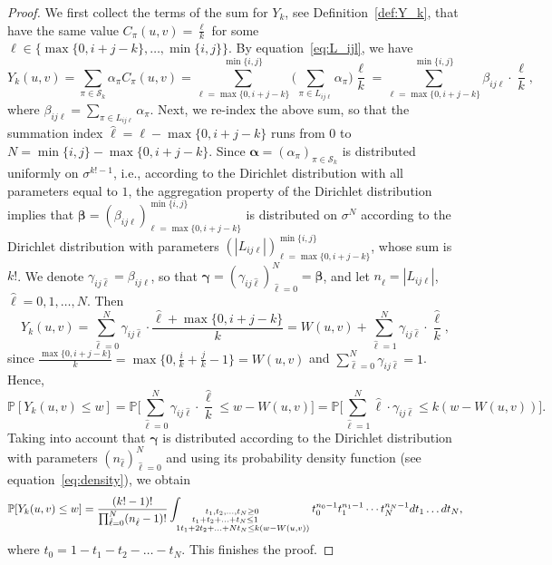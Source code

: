 \documentclass[12pt,a4paper]{amsart}
\theoremstyle{definition}
\newcommand{\SK}{\mathcal{S}_k}
\newcommand{\PP}{\mathbb{P}}
\newcommand{\aaa}{\boldsymbol{\alpha}}
\newcommand{\bbb}{\boldsymbol{\beta}}
\newcommand{\ccc}{\boldsymbol{\gamma}}
\newcommand{\hell}{\hat{\ell}}
\begin{document}
\begin{proof}
We first collect the terms of the sum for $Y_k$, see Definition~\ref{def:Y_k}, that have the same value $C_{\pi}(u,v)=\frac{\ell}{k}$ for some $\ell \in \bigl\{\max\{0,i+j-k\},\ldots,\min\{i,j\}\bigr\}$.
By equation~\eqref{eq:L_ijl}, we have
\begin{equation*}
    Y_k(u,v) =\sum_{\pi \in \SK} \alpha_\pi C_{\pi}(u,v) =\sum_{\ell=\max\{0,i+j-k\}}^{\min\{i,j\}} \Big(\sum_{\pi \in L_{ij\ell}}\alpha_\pi\Big) \frac{\ell}{k}=\sum_{\ell=\max\{0,i+j-k\}}^{\min\{i,j\}} \beta_{ij\ell} \cdot \frac{\ell}{k},
\end{equation*}
where $\beta_{ij\ell}=\sum_{\pi \in L_{ij\ell}}\alpha_\pi$. Next, we re-index the above sum, so that the summation index $\hell=\ell-\max\{0,i+j-k\}$ runs from $0$ to $N=\min\{i,j\}-\max\{0,i+j-k\}$. Since $\aaa=(\alpha_\pi)_{\pi \in \SK}$ is distributed uniformly on $\sigma^{k!-1}$, i.e., according to the Dirichlet distribution with all parameters equal to $1$, the aggregation property of the Dirichlet distribution implies that $\bbb=(\beta_{ij\ell})_{\ell=\max\{0,i+j-k\}}^{\min\{i,j\}}$ is distributed on $\sigma^N$ according to the Dirichlet distribution with parameters $(|L_{ij\ell}|)_{\ell=\max\{0,i+j-k\}}^{\min\{i,j\}}$, whose sum is $k!$.
We denote $\gamma_{ij\hell}=\beta_{ij\ell}$, so that $\ccc=(\gamma_{ij\hell})_{\hell=0}^N=\bbb$, and let $n_{\hell}=|L_{ij\ell}|$, $\hell=0,1,\ldots,N$.
Then
\begin{equation*}
    Y_k(u,v) =\sum_{\hell=0}^N \gamma_{ij\hell} \cdot \frac{\hell+\max\{0,i+j-k\}}{k}=W(u,v)+\sum_{\hell=1}^N \gamma_{ij\hell} \cdot \frac{\hell}{k},
\end{equation*}
since $\frac{\max\{0,i+j-k\}}{k}=\max\{0,\frac{i}{k}+\frac{j}{k}-1\}=W(u,v)$ and $\sum_{\hell=0}^N \gamma_{ij\hell}=1$.
Hence,
\begin{equation*}
    \PP[Y_k(u,v) \le w] =\PP\big[\sum_{\hell=0}^N \gamma_{ij\hell} \cdot \frac{\hell}{k} \le w-W(u,v)\big]=\PP\big[\sum_{\hell=1}^N \hell \cdot \gamma_{ij\hell} \le k(w-W(u,v))\big].
\end{equation*}
Taking into account that $\ccc$ is distributed according to the Dirichlet distribution with parameters $(n_{\hell})_{\hell=0}^N$ and using its probability density function (see equation~\eqref{eq:density}), we obtain
\begin{equation*}
    \PP[Y_k(u,v) \le w] =\frac{(k!-1)!}{\prod_{\hell=0}^N (n_{\hell}-1)!} \int_{\substack{t_1,t_2,\ldots,t_N \ge 0\hspace{0.67cm}\\t_1+t_2+\ldots+t_N \le 1 \hspace{1.11cm}\\ 1t_1+2t_2+\ldots+Nt_N \le k(w-W(u,v))}} t_0^{n_{0}-1} t_1^{n_{1}-1}\cdots t_N^{n_{N}-1} dt_1 \ldots dt_N,
\end{equation*}
where $t_0=1-t_1-t_2-\ldots-t_N$. This finishes the proof.
\end{proof}
\end{document}
